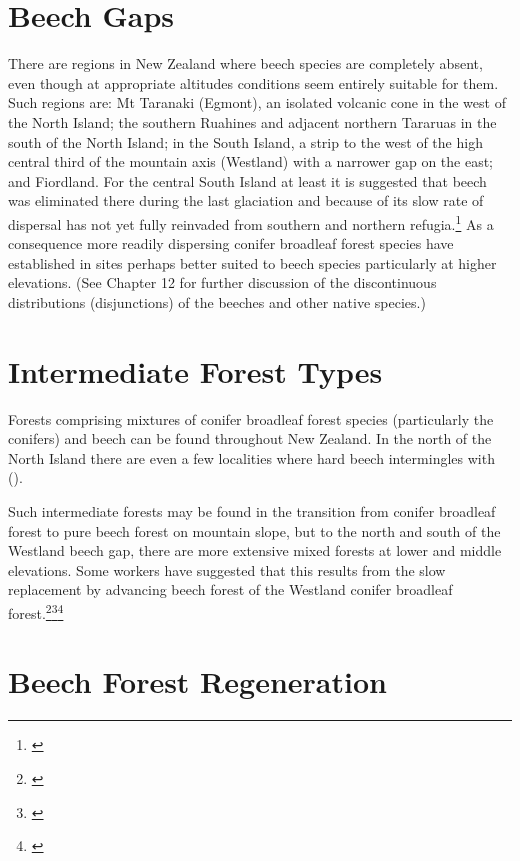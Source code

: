 \section{Beech Gaps}

There are regions in New Zealand where beech species are completely absent, even though at appropriate altitudes conditions seem entirely suitable for them.
Such regions are: Mt Taranaki (Egmont), an isolated volcanic cone in the west of the North Island; the southern Ruahines and adjacent northern Tararuas in the south of the North Island; in the South Island, a strip to the west of the high central third of the mountain axis (Westland) with a narrower gap on the east; and Fiordland.
For the central South Island at least it is suggested that beech was eliminated there during the last glaciation and because of its slow rate of dispersal has not yet fully reinvaded from southern and northern refugia.\footnote{\cite{wardle1965comparison}}
As a consequence more readily dispersing conifer broadleaf forest species have established in sites perhaps better suited to beech species particularly at higher elevations. (See Chapter 12 for further discussion of the discontinuous distributions (disjunctions) of the beeches and other native species.)

\section{Intermediate Forest Types}

Forests comprising mixtures of conifer broadleaf forest species (particularly the conifers) and beech can be found throughout New Zealand.
In the north of the North Island there are even a few localities where hard beech intermingles with  ().

Such intermediate forests may be found in the transition from conifer broadleaf forest to pure beech forest on mountain slope, but to the north and south of the Westland beech gap, there are more extensive mixed forests at lower and middle elevations.
Some workers have suggested that this results from the slow replacement by advancing beech forest of the Westland conifer broadleaf forest.\footnote{\cite{holloway1954forests}}\footnote{\cite{wardle1964facets}}\footnote{\cite{wardle1980ecology}}

\section{Beech Forest Regeneration}

